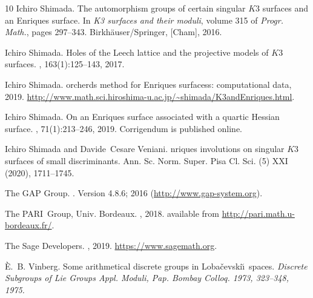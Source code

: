 \documentclass{amsart}
\numberwithin{equation}{section}
\numberwithin{table}{section}
\numberwithin{figure}{section}
\begin{document}
\begin{thebibliography}{10}
Ichiro Shimada.
\newblock The automorphism groups of certain singular {$K3$} surfaces and an
  {E}nriques surface.
\newblock In {\em K3 surfaces and their moduli}, volume 315 of {\em Progr.
  Math.}, pages 297--343. Birkh\"{a}user/Springer, [Cham], 2016.

Ichiro Shimada.
\newblock Holes of the {L}eech lattice and the projective models of {$K3$}
  surfaces.
, 163(1):125--143, 2017.

Ichiro Shimada.
orcherds method for {E}nriques surfacess: computational data,
  2019.
\newblock
  \url{http://www.math.sci.hiroshima-u.ac.jp/~shimada/K3andEnriques.html}.

Ichiro Shimada.
\newblock On an {E}nriques surface associated with a quartic {H}essian surface.
, 71(1):213--246, 2019.
Corrigendum is published online.

Ichiro Shimada and Davide~Cesare Veniani.
nriques involutions on singular {$K3$} surfaces of small
  discriminants.
  \newblock Ann. Sc. Norm. Super. Pisa Cl. Sci. (5) XXI (2020), 1711--1745.
   


{The GAP Group}.
.
\newblock Version 4.8.6; 2016 (\url{http://www.gap-system.org}).

{The PARI~Group}, Univ. Bordeaux.
, 2018.
\newblock available from \url{http://pari.math.u-bordeaux.fr/}.

{The Sage Developers}.
, 2019.
\newblock \url{https://www.sagemath.org}.

\`E.~B. Vinberg.
\newblock Some arithmetical discrete groups in {L}oba\v cevski\u\i \ spaces.
\newblock \em{Discrete Subgroups of Lie Groups Appl. Moduli, Pap. Bombay Colloq. 1973, 323--348, 1975.}


\end{thebibliography}
\end{document}
